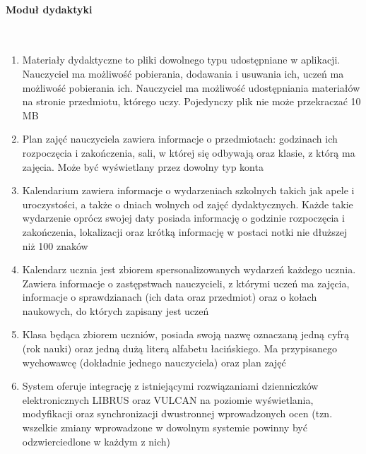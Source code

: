 \documentclass{article}
\begin{document}
\paragraph{Moduł dydaktyki} \mbox{}\\
\begin{enumerate}
	\item Materiały dydaktyczne to pliki dowolnego typu udostępniane w aplikacji. Nauczyciel ma możliwość pobierania, dodawania i usuwania ich, uczeń ma możliwość pobierania ich. Nauczyciel ma możliwość udostępniania materiałów na stronie przedmiotu, którego uczy. Pojedynczy plik nie może przekraczać 10 MB
    \item Plan zajęć nauczyciela zawiera informacje o przedmiotach: godzinach ich rozpoczęcia i zakończenia, sali, w której się odbywają oraz klasie, z którą ma zajęcia. Może być wyświetlany przez dowolny typ konta
    \item Kalendarium zawiera informacje o wydarzeniach szkolnych takich jak apele i uroczystości, a także o dniach wolnych od zajęć dydaktycznych. Każde takie wydarzenie oprócz swojej daty posiada informację o godzinie rozpoczęcia i zakończenia, lokalizacji oraz krótką informację w postaci notki nie dłuższej niż 100 znaków
    \item Kalendarz ucznia jest zbiorem spersonalizowanych wydarzeń każdego ucznia. Zawiera informacje o zastępstwach nauczycieli, z którymi uczeń ma zajęcia, informacje o sprawdzianach (ich data oraz przedmiot) oraz o kołach naukowych, do których zapisany jest uczeń
    \item Klasa będąca zbiorem uczniów, posiada swoją nazwę oznaczaną jedną cyfrą (rok nauki) oraz jedną dużą literą alfabetu łacińskiego. Ma przypisanego wychowawcę (dokładnie jednego nauczyciela) oraz plan zajęć
    \item System oferuje integrację z istniejącymi rozwiązaniami dzienniczków elektronicznych LIBRUS oraz VULCAN na poziomie wyświetlania, modyfikacji oraz synchronizacji dwustronnej wprowadzonych ocen (tzn. wszelkie zmiany wprowadzone w dowolnym systemie powinny być odzwierciedlone w każdym z nich)
\end{enumerate}
\end{document}
